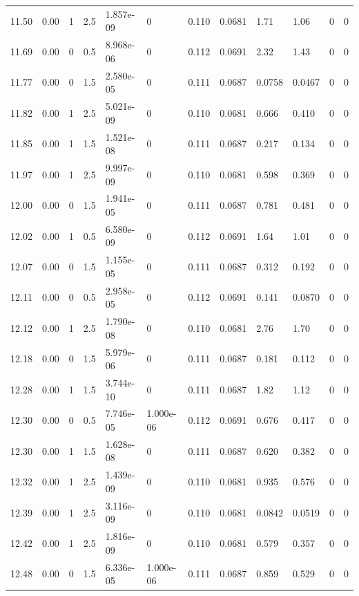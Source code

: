 \documentclass[preview]{standalone}
\begin{document}
{{{{{{{\begin{tabular}{L{1.2cm}C{1.2cm} C{0.3cm}C{0.5cm} C{1.4cm}C{1.4cm} C{1.4cm}C{1.4cm} C{1.6cm}C{1.6cm} C{1.6cm}C{1.6cm}}
  11.50  &  0.00  & 1     & 2.5 &  1.857e-09  & 0  &  0.110&   0.0681& 1.71 & 1.06   &  0 & 0  \\ 
  11.69  &  0.00  & 0     & 0.5 &  8.968e-06  & 0  &  0.112&   0.0691& 2.32 & 1.43   &  0 & 0  \\ 
  11.77  &  0.00  & 0     & 1.5 &  2.580e-05  & 0  &  0.111&   0.0687& 0.0758 & 0.0467   &  0 & 0  \\ 
  11.82  &  0.00  & 1     & 2.5 &  5.021e-09  & 0  &  0.110&   0.0681& 0.666 & 0.410   &  0 & 0  \\ 
  11.85  &  0.00  & 1     & 1.5 &  1.521e-08  & 0  &  0.111&   0.0687& 0.217 & 0.134   &  0 & 0  \\ 
  11.97  &  0.00  & 1     & 2.5 &  9.997e-09  & 0  &  0.110&   0.0681& 0.598 & 0.369   &  0 & 0  \\ 
  12.00  &  0.00  & 0     & 1.5 &  1.941e-05  & 0  &  0.111&   0.0687& 0.781 & 0.481   &  0 & 0  \\ 
  12.02  &  0.00  & 1     & 0.5 &  6.580e-09  & 0  &  0.112&   0.0691& 1.64 & 1.01   &  0 & 0  \\ 
  12.07  &  0.00  & 0     & 1.5 &  1.155e-05  & 0  &  0.111&   0.0687& 0.312 & 0.192   &  0 & 0  \\ 
  12.11  &  0.00  & 0     & 0.5 &  2.958e-05  & 0  &  0.112&   0.0691& 0.141 & 0.0870   &  0 & 0  \\ 
  12.12  &  0.00  & 1     & 2.5 &  1.790e-08  & 0  &  0.110&   0.0681& 2.76 & 1.70   &  0 & 0  \\ 
  12.18  &  0.00  & 0     & 1.5 &  5.979e-06  & 0  &  0.111&   0.0687& 0.181 & 0.112   &  0 & 0  \\ 
  12.28  &  0.00  & 1     & 1.5 &  3.744e-10  & 0  &  0.111&   0.0687& 1.82 & 1.12   &  0 & 0  \\ 
  12.30  &  0.00  & 0     & 0.5 &  7.746e-05  & 1.000e-06  &  0.112&   0.0691& 0.676 & 0.417   &  0 & 0  \\ 
  12.30  &  0.00  & 1     & 1.5 &  1.628e-08  & 0  &  0.111&   0.0687& 0.620 & 0.382   &  0 & 0  \\ 
  12.32  &  0.00  & 1     & 2.5 &  1.439e-09  & 0  &  0.110&   0.0681& 0.935 & 0.576   &  0 & 0  \\ 
  12.39  &  0.00  & 1     & 2.5 &  3.116e-09  & 0  &  0.110&   0.0681& 0.0842 & 0.0519   &  0 & 0  \\ 
  12.42  &  0.00  & 1     & 2.5 &  1.816e-09  & 0  &  0.110&   0.0681& 0.579 & 0.357   &  0 & 0  \\ 
  12.48  &  0.00  & 0     & 1.5 &  6.336e-05  & 1.000e-06  &  0.111&   0.0687& 0.859 & 0.529   &  0 & 0  \\ 

\end{tabular}}}}}}}}
\end{document}
